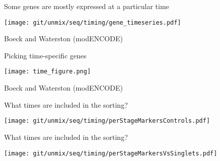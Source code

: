 \documentclass[serif,9pt]{beamer}
\begin{document}
\begin{frame}{Some genes are mostly expressed at a particular time}

\texttt{[image: git/unmix/seq/timing/gene\_timeseries.pdf]}

\hfill Boeck and Waterston (modENCODE)

\end{frame}

\begin{frame}{Picking time-specific genes}

\texttt{[image: time\_figure.png]}

\hfill Boeck and Waterston (modENCODE)

\end{frame}

\begin{frame}{What times are included in the sorting?}

\begin{centering}
\texttt{[image: git/unmix/seq/timing/perStageMarkersControls.pdf]}
\end{centering}

\end{frame}

\begin{frame}{What times are included in the sorting?}

\begin{centering}
\texttt{[image: git/unmix/seq/timing/perStageMarkersVsSinglets.pdf]}
\end{centering}

\end{frame}
\end{document}
